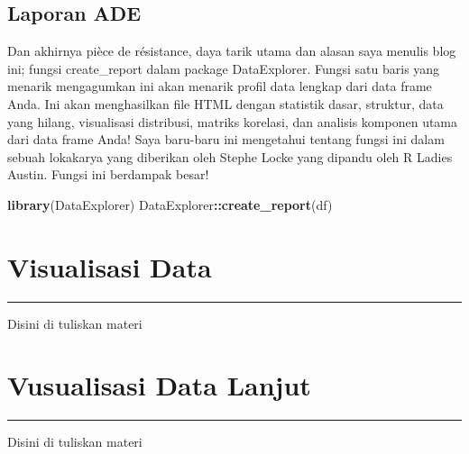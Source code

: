 \documentclass[
]{book}
\newenvironment{Shaded}{\begin{snugshade}}{\end{snugshade}}
\newcommand{\KeywordTok}[1]{\textcolor[rgb]{0.13,0.29,0.53}{\textbf{#1}}}
\newcommand{\NormalTok}[1]{#1}
\newcommand{\OperatorTok}[1]{\textcolor[rgb]{0.81,0.36,0.00}{\textbf{#1}}}
\begin{document}
\hypertarget{laporan-ade}{%
\section{Laporan ADE}\label{laporan-ade}}

Dan akhirnya pièce de résistance, daya tarik utama dan alasan saya menulis blog ini; fungsi create\_report dalam package DataExplorer. Fungsi satu baris yang menarik mengagumkan ini akan menarik profil data lengkap dari data frame Anda. Ini akan menghasilkan file HTML dengan statistik dasar, struktur, data yang hilang, visualisasi distribusi, matriks korelasi, dan analisis komponen utama dari data frame Anda! Saya baru-baru ini mengetahui tentang fungsi ini dalam sebuah lokakarya yang diberikan oleh Stephe Locke yang dipandu oleh R Ladies Austin. Fungsi ini berdampak besar!

\begin{Shaded}
\begin{Highlighting}[]
\KeywordTok{library}\NormalTok{(DataExplorer)}
\NormalTok{DataExplorer}\OperatorTok{::}\KeywordTok{create_report}\NormalTok{(df)}
\end{Highlighting}
\end{Shaded}

\hypertarget{Visualisasi-Data}{%
\chapter{Visualisasi Data}\label{Visualisasi-Data}}

\begin{center}\rule{0.5\linewidth}{0.5pt}\end{center}

Disini di tuliskan materi

\hypertarget{Vusualisasi-Data-Lanjut}{%
\chapter{Vusualisasi Data Lanjut}\label{Vusualisasi-Data-Lanjut}}

\begin{center}\rule{0.5\linewidth}{0.5pt}\end{center}

Disini di tuliskan materi

  
\end{document}
